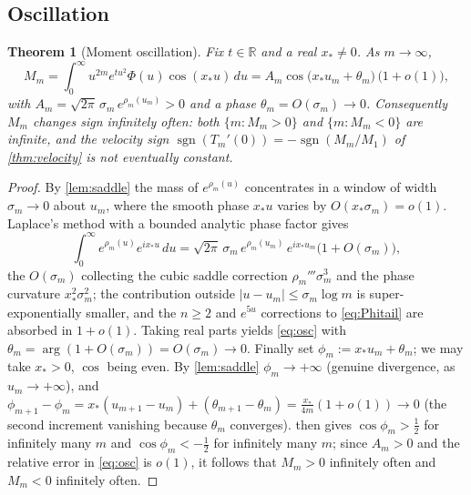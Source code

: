 \documentclass[11pt,reqno]{amsart}
\theoremstyle{plain}
\newtheorem{theorem}{Theorem}[section]
\theoremstyle{definition}
\theoremstyle{remark}
\newcommand{\R}{\mathbb R}
\DeclareMathOperator{\sgn}{sgn}
\begin{document}
\subsection{Oscillation}
\begin{theorem}[Moment oscillation]\label{thm:oscillation}
Fix $t\in\R$ and a real $x_*\neq0$. As $m\to\infty$,
\begin{equation}\label{eq:osc}
  M_m=\int_0^\infty u^{2m}e^{tu^2}\Phi(u)\cos(x_*u)\,du
  =A_m\cos\bigl(x_*u_m+\theta_m\bigr)\,\bigl(1+o(1)\bigr),
\end{equation}
with $A_m=\sqrt{2\pi}\,\sigma_m\,e^{\rho_m(u_m)}>0$ and a phase
$\theta_m=O(\sigma_m)\to0$. Consequently $M_m$ changes sign infinitely
often: both $\{m:M_m>0\}$ and $\{m:M_m<0\}$ are infinite, and the velocity
sign $\sgn(T_m'(0))=-\sgn(M_m/M_1)$ of \cref{thm:velocity} is not eventually
constant.
\end{theorem}

\begin{proof}
By \cref{lem:saddle} the mass of $e^{\rho_m(u)}$ concentrates in a window of
width $\sigma_m\to0$ about $u_m$, where the smooth phase $x_*u$ varies by
$O(x_*\sigma_m)=o(1)$. Laplace's method with a bounded analytic phase factor
gives
\[
  \int_0^\infty e^{\rho_m(u)}e^{ix_*u}\,du
  =\sqrt{2\pi}\,\sigma_m\,e^{\rho_m(u_m)}\,e^{i x_*u_m}\bigl(1+O(\sigma_m)\bigr),
\]
the $O(\sigma_m)$ collecting the cubic saddle correction
$\rho_m'''\sigma_m^3$ and the phase curvature $x_*^2\sigma_m^2$; the
contribution outside $|u-u_m|\le\sigma_m\log m$ is super-exponentially
smaller, and the $n\ge2$ and $e^{5u}$ corrections to \eqref{eq:Phitail} are
absorbed in $1+o(1)$. Taking real parts yields \eqref{eq:osc} with
$\theta_m=\arg(1+O(\sigma_m))=O(\sigma_m)\to0$. Finally set
$\phi_m:=x_*u_m+\theta_m$; we may take $x_*>0$, $\cos$ being even. By
\cref{lem:saddle} $\phi_m\to+\infty$ (genuine divergence, as
$u_m\to+\infty$), and
$\phi_{m+1}-\phi_m=x_*(u_{m+1}-u_m)+(\theta_{m+1}-\theta_m)
=\tfrac{x_*}{4m}(1+o(1))\to0$ (the second increment vanishing because
$\theta_m$ converges).  then gives $\cos\phi_m>\tfrac12$
for infinitely many $m$ and $\cos\phi_m<-\tfrac12$ for infinitely many $m$;
since $A_m>0$ and the relative error in \eqref{eq:osc} is $o(1)$, it follows
that $M_m>0$ infinitely often and $M_m<0$ infinitely often.
\end{proof}
\end{document}
